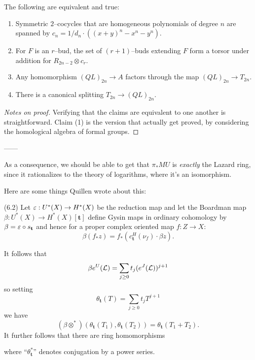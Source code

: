 \begin{lemma}\label{Symmetric2CocycleLemma}
The following are equivalent and true:
\begin{enumerate}
\item Symmetric $2$--cocycles that are homogeneous polynomials of degree $n$ are spanned by $c_n = 1/d_n \cdot ((x + y)^n - x^n - y^n)$.
\item For $F$ is an $r$--bud, the set of $(r+1)$--buds extending $F$ form a torsor under addition for $R_{2n-2} \otimes c_r$.
\item Any homomorphism $(QL)_{2n} \to A$ factors through the map $(QL)_{2n} \to T_{2n}$.
\item There is a canonical splitting $T_{2n} \to (QL)_{2n}$.
\end{enumerate}
\end{lemma}
\begin{proof}[Notes on proof]
Verifying that the claims are equivalent to one another is straightforward.  Claim (1) is the version that actually get proved, by considering the homological algebra of formal groups.  
\end{proof}



------

As a consequence, we should be able to get that $\pi_* MU$ is \emph{exactly} the Lazard ring, since it rationalizes to the theory of logarithms, where it's an isomorphism.

Here are some things Quillen wrote about this:

\begin{definition}(6.2)
Let $\varepsilon: U^*(X) \to H^*(X)$ be the reduction map and let the Boardman map $\beta: U^*(X) \to H^*(X)[\mathbf t]$ define Gysin maps in ordinary cohomology by $\beta = \varepsilon \circ s_{\mathbf t}$ and hence for a proper complex oriented map $f: Z \to X$: \[\beta(f_* z) = f_*(c_{\mathbf t}^H(\nu_f) \cdot \beta z).\] 
\end{definition}

\begin{definition}
It follows that \[\beta e^U(\mathcal{L}) = \sum_{j \ge 0} t_j(e^J(\mathcal{L}))^{j+1}\] so setting \[\theta_{\mathbf t}(T) = \sum_{j \ge 0} t_j T^{j+1}\] we have \[(\beta \otimes^*)(\theta_{\mathbf t}(T_1), \theta_{\mathbf t}(T_2)) = \theta_{\mathbf t}(T_1 + T_2).\]  It further follows that there are ring homomorphisms
\begin{center}
\end{center}
where ``$\theta_{\mathbf t}^*$'' denotes conjugation by a power series.
\end{definition}

